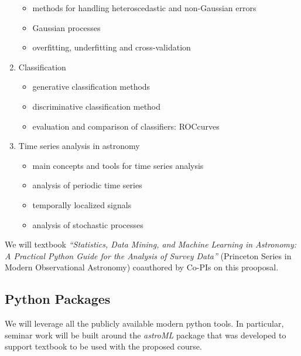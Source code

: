 \begin{enumerate}
\begin{itemize}
\item  methods for handling heteroscedastic and non-Gaussian errors 
\item  Gaussian processes
\item  overfitting, underfitting and cross-validation
\end{itemize} 
\item Classification 
\begin{itemize}
\item  generative classification methods
\item  discriminative classification method 
\item  evaluation and comparison of classifiers: ROCcurves 
\end{itemize} 
\item Time series analysis in astronomy
\begin{itemize}
\item  main concepts and tools for time series analysis
\item  analysis of periodic time series 
\item  temporally localized signals
\item  analysis of stochastic processes
\end{itemize} 
\end{enumerate} 


We will textbook {\it ``Statistics, Data Mining, and Machine Learning in Astronomy:
A Practical Python Guide for the Analysis of Survey Data''} (Princeton Series in Modern 
Observational Astronomy) coauthored by Co-PIs on this prooposal. 


\subsection{Python Packages} 



We will leverage all the publicly available modern python tools. 
In particular,  seminar work will be built around the {\it astroML} package
that was developed to support textbook to be used with the proposed course. 


